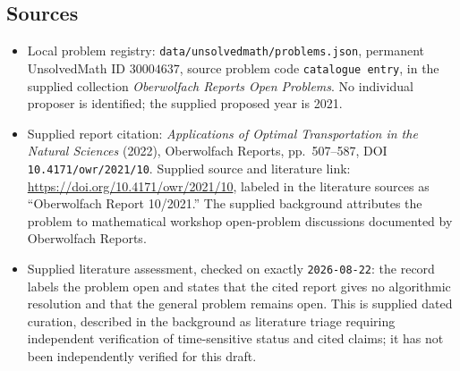 \documentclass[11pt]{article}
\begin{document}
\subsection{Sources}
\begin{itemize}
\item Local problem registry: \texttt{data/unsolvedmath/problems.json}, permanent UnsolvedMath ID \(30004637\), source problem code \texttt{catalogue entry}, in the supplied collection \emph{Oberwolfach Reports Open Problems}. No individual proposer is identified; the supplied proposed year is 2021.
\item Supplied report citation: \emph{Applications of Optimal Transportation in the Natural Sciences} (2022), Oberwolfach Reports, pp.~507--587, DOI \texttt{10.4171/owr/2021/10}. Supplied source and literature link: \url{https://doi.org/10.4171/owr/2021/10}, labeled in the literature sources as ``Oberwolfach Report 10/2021.'' The supplied background attributes the problem to mathematical workshop open-problem discussions documented by Oberwolfach Reports.
\item Supplied literature assessment, checked on exactly \texttt{2026-08-22}: the record labels the problem open and states that the cited report gives no algorithmic resolution and that the general problem remains open. This is supplied dated curation, described in the background as literature triage requiring independent verification of time-sensitive status and cited claims; it has not been independently verified for this draft.
\end{itemize}
\end{document}
